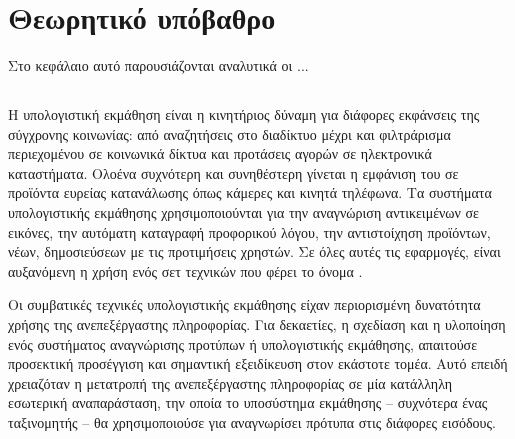 \chapter{Θεωρητικό υπόβαθρο}

Στο κεφάλαιο αυτό παρουσιάζονται αναλυτικά οι ...

\section{\cite{LeCun2015}}

Η υπολογιστική εκμάθηση  είναι η κινητήριος δύναμη για διάφορες εκφάνσεις της σύγχρονης κοινωνίας: από αναζητήσεις στο διαδίκτυο μέχρι και φιλτράρισμα περιεχομένου σε κοινωνικά δίκτυα και προτάσεις αγορών σε ηλεκτρονικά καταστήματα. 
Ολοένα συχνότερη και συνηθέστερη γίνεται η εμφάνιση του σε προϊόντα ευρείας κατανάλωσης όπως κάμερες και κινητά τηλέφωνα. 
Τα συστήματα υπολογιστικής εκμάθησης χρησιμοποιούνται για την αναγνώριση αντικειμένων σε εικόνες, την αυτόματη καταγραφή προφορικού λόγου, την αντιστοίχηση προϊόντων, νέων, δημοσιεύσεων με τις προτιμήσεις χρηστών. 
Σε όλες αυτές τις εφαρμογές, είναι αυξανόμενη η χρήση ενός σετ τεχνικών που φέρει το όνομα .

Οι συμβατικές τεχνικές υπολογιστικής εκμάθησης είχαν περιορισμένη δυνατότητα χρήσης της ανεπεξέργαστης πληροφορίας. 
Για δεκαετίες, η σχεδίαση και η υλοποίηση ενός συστήματος αναγνώρισης προτύπων ή υπολογιστικής εκμάθησης, απαιτούσε προσεκτική προσέγγιση και σημαντική εξειδίκευση στον εκάστοτε τομέα. 
Αυτό επειδή χρειαζόταν η μετατροπή της ανεπεξέργαστης πληροφορίας σε μία κατάλληλη εσωτερική αναπαράσταση, την οποία το υποσύστημα εκμάθησης -- συχνότερα ένας ταξινομητής -- θα χρησιμοποιούσε για αναγνωρίσει πρότυπα στις διάφορες εισόδους.

